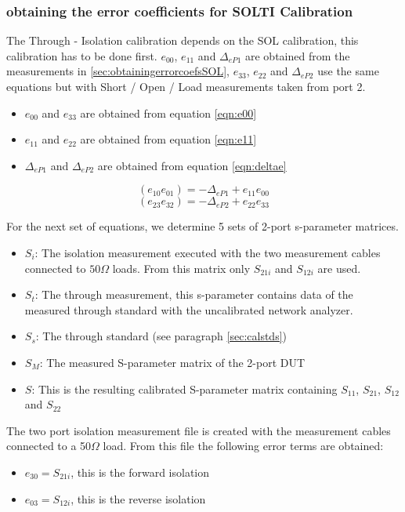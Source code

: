 \subsubsection{obtaining the error coefficients for SOLTI Calibration}
\label{sec:obtainingsolti}
The Through - Isolation calibration depends on the SOL calibration, this calibration has to be done first. 
$e_{00}$, $e_{11}$ and $\Delta_{eP1}$ are obtained from the measurements in \ref{sec:obtainingerrorcoefsSOL}, $e_{33}$, $e_{22}$ and $\Delta_{eP2}$ use the same equations but with Short / Open / Load measurements taken from port 2.
\begin{itemize}
	\item {$e_{00}$ and $e_{33}$ are obtained from equation \ref{eqn:e00}}
	\item {$e_{11}$ and $e_{22}$ are obtained from equation \ref{eqn:e11}}	
	\item {$\Delta_{eP1}$ and $\Delta_{eP2}$ are obtained from equation \ref{eqn:deltae}}
\end{itemize}

\begin{equation}
(e_{10}e_{01}) = -\Delta_{eP1}+e_{11}e_{00}
\end{equation}
\begin{equation}
(e_{23}e_{32}) = -\Delta_{eP2}+e_{22}e_{33}
\end{equation}

For the next set of equations, we determine 5 sets of 2-port s-parameter matrices.
\begin{itemize}
	\item {$S_i$: The isolation measurement executed with the two measurement cables connected to $50\Omega$ loads. From this matrix only $S_{21i}$ and $S_{12i}$ are used.}
	\item {$S_t$: The through measurement, this s-parameter contains data of the measured through standard with the uncalibrated network analyzer.}
	\item {$S_s$: The through standard (see paragraph \ref{sec:calstds})}
	\item {$S_M$: The measured S-parameter matrix of the 2-port DUT}
	\item {$S$: This is the resulting calibrated S-parameter matrix containing $S_{11}$, $S_{21}$, $S_{12}$ and $S_{22}$}
	
\end{itemize}
The two port isolation measurement file is created with the measurement cables connected to a 50$\Omega$ load. From this file the following error terms are obtained:
\begin{itemize}
	\item $e_{30} = S_{21i}$, this is the forward isolation
	\item $e_{03} = S_{12i}$, this is the reverse isolation
\end{itemize}



